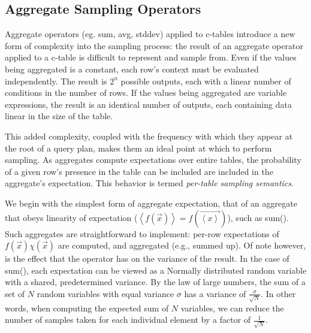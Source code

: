 %


\subsection{Aggregate Sampling Operators}
Aggregate operators (eg. sum, avg, stddev) applied to c-tables introduce a new form of complexity into the sampling process: the result of an aggregate operator applied to a c-table is difficult to represent and sample from.  Even if the values being aggregated is a constant, each row's context must be evaluated independently.  The result is $2^n$ possible outputs, each with a linear number of conditions in the number of rows.  If the values being aggregated are variable expressions, the result is an identical number of outputs, each containing data linear in the size of the table.  

This added complexity, coupled with the frequency with which they appear at the root of a query plan, makes them an ideal point at which to perform sampling.  As aggregates compute expectations over entire tables, the probability of a given row's presence in the table can be included are included in the aggregate's expectation.  This behavior is termed \textit{per-table sampling semantics}.

We begin with the simplest form of aggregate expectation, that of an aggregate that obeys linearity of expectation ($\left<f(\vec{x})\right> = f(\vec{\left<x\right>})$), such as sum().  Such aggregates are straightforward to implement: per-row expectations of $f(\vec x)\chi(\vec x)$ are computed, and aggregated (e.g., summed up).  Of note however, is the effect that the operator has on the variance of the result.  In the case of sum(), each expectation can be viewed as a Normally distributed random variable with a shared, predetermined variance.  By the law of large numbers, the sum of a set of $N$ random variables with equal variance $\sigma$ has a variance of $\frac{\sigma}{\sqrt{N}}$.  In other words, when computing the expected sum of $N$ variables, we can reduce the number of samples taken for each individual element by a factor of $\frac{1}{\sqrt{N}}$.


